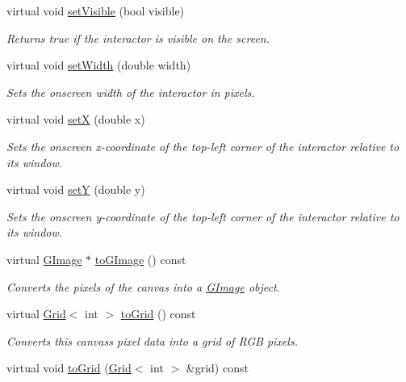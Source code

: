 \begin{DoxyCompactItemize}
virtual void \mbox{\hyperlink{classGInteractor_a18e44e30b31525a243960ca3928125aa}{set\+Visible}} (bool visible)
\begin{DoxyCompactList}\small\item\em Returns true if the interactor is visible on the screen. \end{DoxyCompactList}\item 
virtual void \mbox{\hyperlink{classGInteractor_aa3f3fba4cb131baa8696ba01e3bceca1}{set\+Width}} (double width)
\begin{DoxyCompactList}\small\item\em Sets the onscreen width of the interactor in pixels. \end{DoxyCompactList}\item 
virtual void \mbox{\hyperlink{classGInteractor_a9c18fcc579333bf9653d13ad2b372e39}{setX}} (double x)
\begin{DoxyCompactList}\small\item\em Sets the onscreen x-\/coordinate of the top-\/left corner of the interactor relative to its window. \end{DoxyCompactList}\item 
virtual void \mbox{\hyperlink{classGInteractor_a7d57e2a5c35d27feb58fd498a3cf82b9}{setY}} (double y)
\begin{DoxyCompactList}\small\item\em Sets the onscreen y-\/coordinate of the top-\/left corner of the interactor relative to its window. \end{DoxyCompactList}\item 
virtual \mbox{\hyperlink{classGImage}{G\+Image}} $\ast$ \mbox{\hyperlink{classGCanvas_aa2b5affed24054a09bddfe568d11200b}{to\+G\+Image}} () const
\begin{DoxyCompactList}\small\item\em Converts the pixels of the canvas into a \mbox{\hyperlink{classGImage}{G\+Image}} object. \end{DoxyCompactList}\item 
virtual \mbox{\hyperlink{classGrid}{Grid}}$<$ int $>$ \mbox{\hyperlink{classGCanvas_a2f9b15856aaf66aa95cfd7405bd972cc}{to\+Grid}} () const
\begin{DoxyCompactList}\small\item\em Converts this canvas\textquotesingle{}s pixel data into a grid of R\+GB pixels. \end{DoxyCompactList}\item 
virtual void \mbox{\hyperlink{classGCanvas_a11c06bec679dda1519ed914bca68900a}{to\+Grid}} (\mbox{\hyperlink{classGrid}{Grid}}$<$ int $>$ \&grid) const

\end{DoxyCompactItemize}
